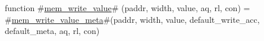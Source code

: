 function #\hyperref[sailRISCVzmemzywritezyvalue]{mem\_write\_value}# (paddr, width, value, aq, rl, con) =
  #\hyperref[sailRISCVzmemzywritezyvaluezymeta]{mem\_write\_value\_meta}#(paddr, width, value, default_write_acc, default_meta, aq, rl, con)
